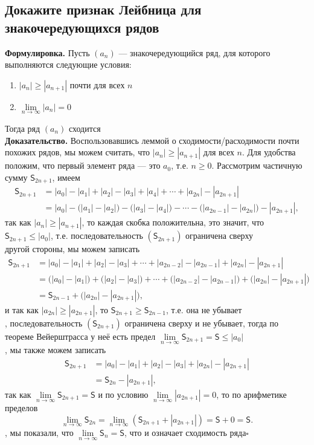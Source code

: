 \documentclass[a4paper]{article}
\newcommand{\qed}{\hfill$\square$}
\begin{document}
\subsection{Докажите признак Лейбница для знакочередующихся рядов}
\textbf{Формулировка.} Пусть $(a_n)$ — знакочередующийся ряд, для которого выполняются следующие условия:
\begin{enumerate}
    \item $|a_n| \geqslant |a_{n+1}|$ почти для всех $n$
    \item $\lim\limits_{n \to \infty} |a_n| = 0$
\end{enumerate}
Тогда ряд $(a_n)$ сходится\\[4mm]
\indent\textbf{Доказательство.} Воспользовавшись леммой о сходимости/расходимости почти похожих рядов, мы можем считать, что $|a_n| \geqslant |a_{n+1}|$ для всех $n$. Для удобства положим, что первый элемент ряда — это $a_0$, т.е. $n \geqslant 0$. Рассмотрим частичную сумму $\mathsf{S}_{2n+1}$, имеем
$$\begin{aligned}
\mathsf{S}_{2n+1} &= |a_0| - |a_1| + |a_2| - |a_3| + |a_4| + \cdots  + |a_{2n}| - |a_{2n+1}| \\
&= |a_0| - \bigl(|a_1| - |a_2|\bigr) - \bigl(|a_3| - |a_4|\bigr) - \cdots - \bigl(|a_{2n-1}|-  |a_{2n}|\bigr) - |a_{2n+1}|,
\end{aligned}$$
так как $|a_n| \geqslant |a_{n+1}|$, то каждая скобка положительна, это значит, что $\mathsf{S}_{2n+1} \leqslant |a_0|$, т.е. последовательность $(\mathsf{S}_{2n+1})$ ограничена сверху\\[2mm]
 другой стороны, мы можем записать
$$\begin{aligned}
\mathsf{S}_{2n+1} &= |a_0| - |a_1| + |a_2| - |a_3| + \cdots  + |a_{2n-2}| - |a_{2n-1}| + |a_{2n}| - |a_{2n+1}| \\
&= \bigl(|a_0| - |a_1| \bigr) + \bigl(|a_2|-|a_3| \bigr) + \cdots + \bigl( |a_{2n-2}| - |a_{2n-1}|\bigr)+ \bigl(|a_{2n}| - |a_{2n+1}|\bigr) \\
&= \mathsf{S}_{2n-1} + \bigl(|a_{2n}| - |a_{2n+1}|\bigr),
\end{aligned}$$
и так как $|a_{2n}| \geqslant |a_{2n+1}|$, то $\mathsf{S}_{2n+1} \geqslant \mathsf{S}_{2n-1}$, т.е. она не убывает\\[2mm]
, последовательность $\left(\mathsf{S}_{2n+1}\right)$ ограничена сверху и не убывает, тогда по теореме Вейерштрасса у неё есть предел $\lim\limits_{n \to \infty}\mathsf{S}_{2n+1} = \mathsf{S} \leqslant |a_0|$\\[2mm]
, мы также можем записать
$$\begin{aligned}
\mathsf{S}_{2n+1} &= |a_0| - |a_1| + |a_2| - |a_3| +  |a_{2n}| - |a_{2n+1}| \\
&= \mathsf{S}_{2n}  - |a_{2n+1}|,
\end{aligned}$$
так как $\lim\limits_{n \to \infty}\mathsf{S}_{2n+1} = \mathsf{S}$ и по условию $\lim\limits_{n\to \infty} |a_{2n+1}| = 0$, то по арифметике пределов
$$
\lim_{n\to \infty}\mathsf{S}_{2n}  = \lim_{n\to \infty} \left( \mathsf{S}_{2n+1} + |a_{2n+1}| \right) = \mathsf{S} + 0 = \mathsf{S}.
$$
, мы показали, что $\lim\limits_{n \to \infty}\mathsf{S}_n = \mathsf{S}$, что и означает сходимость ряда\qed
\end{document}
